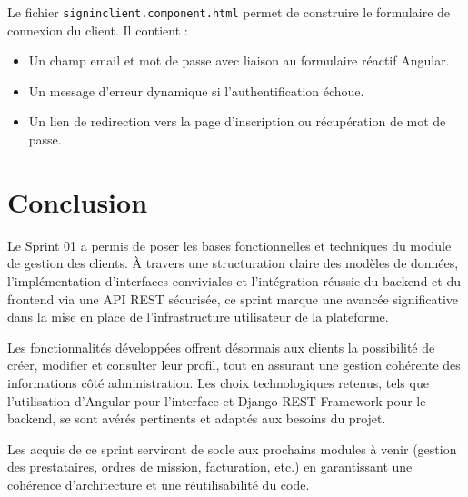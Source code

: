 \noindent
Le fichier \texttt{signinclient.component.html} permet de construire le formulaire de connexion du client. Il contient :
\begin{itemize}
    \item Un champ email et mot de passe avec liaison au formulaire réactif Angular.
    \item Un message d’erreur dynamique si l’authentification échoue.
    \item Un lien de redirection vers la page d’inscription ou récupération de mot de passe.
\end{itemize}
\section*{Conclusion}

Le Sprint 01 a permis de poser les bases fonctionnelles et techniques du module de gestion des clients. À travers une structuration claire des modèles de données, l’implémentation d’interfaces conviviales et l’intégration réussie du backend et du frontend via une API REST sécurisée, ce sprint marque une avancée significative dans la mise en place de l’infrastructure utilisateur de la plateforme.

Les fonctionnalités développées offrent désormais aux clients la possibilité de créer, modifier et consulter leur profil, tout en assurant une gestion cohérente des informations côté administration. Les choix technologiques retenus, tels que l’utilisation d’Angular pour l’interface et Django REST Framework pour le backend, se sont avérés pertinents et adaptés aux besoins du projet.

Les acquis de ce sprint serviront de socle aux prochains modules à venir (gestion des prestataires, ordres de mission, facturation, etc.) en garantissant une cohérence d’architecture et une réutilisabilité du code.



